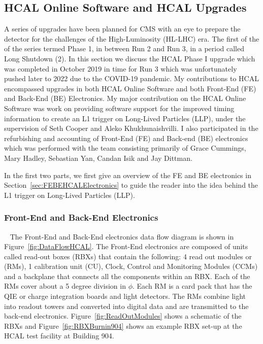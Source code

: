 \subsection{HCAL Online Software and HCAL Upgrades}

A series of upgrades have been planned for CMS with an eye to prepare the detector for the challenges of the High-Luminosity (HL-LHC) era. The first of the of the series termed Phase 1, in between Run 2 and Run 3, in a period called Long Shutdown (2). In this section we discuss the HCAL Phase I upgrade which was completed in October 2019 in time for Run 3 which was unfortunately pushed later to 2022 due to the COVID-19 pandemic. My contributions to HCAL encompassed upgrades in both HCAL Online Software and both Front-End (FE) and Back-End (BE) Electronics. My major contribution on the HCAL Online Software was work on providing software support for the improved timing information to create an L1 trigger on Long-Lived Particles (LLP), under the supervision of Seth Cooper and Aleko Khukhunaishvilli. I also participated in the refurbishing and accounting of Front-End (FE) and Back-end (BE) electronics which was performed with the team consisting primarily of Grace Cummings, Mary Hadley, Sebastian Yan, Candan Isik and Jay Dittman.

In the first two parts, we first give an overview of the FE and BE electronics in Section~\ref{sec:FEBEHCALElectronics} to guide the reader into the idea behind the L1 trigger on Long-Lived Particles (LLP).

\subsubsection{Front-End and Back-End Electronics}~\label{sec:FEBEHCALElectronics}
The Front-End and Back-End electronics data flow diagram is shown in Figure~\ref{fig:DataFlowHCAL}. The Front-End electronics are composed of units called read-out boxes (RBXs) that contain the following: 4 read out modules or (RMs), 1 calibration unit (CU), Clock, Control and Monitoring Modules (CCMs) and a backplane that connects all the components within an RBX. Each of the RMs cover about a 5 degree division in $\phi$. Each RM is a card pack that has the QIE or charge integration boards and light detectors. The RMs combine light into readout towers and converted into digital data and are transmitted to the back-end electronics. Figure~\ref{fig:ReadOutModules} shows a schematic of the RBXs and Figure~\ref{fig:RBXBurnin904} shows an example RBX set-up at the HCAL test facility at Building 904.

